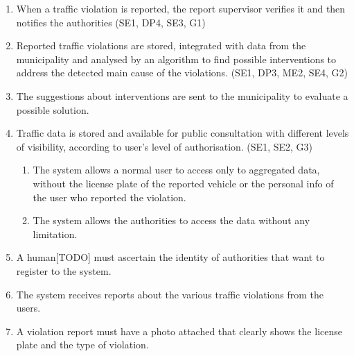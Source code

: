 \begin{enumerate}[label={R\arabic*.}]
    \item When a traffic violation is reported, the report supervisor verifies it and then notifies the authorities (SE1, DP4, SE3, G1)
    \item Reported traffic violations are stored, integrated with data from the municipality and analysed by an algorithm to find possible interventions to address the detected main cause of the violations. (SE1, DP3, ME2, SE4, G2)
    \item The suggestions about interventions are sent to the municipality to evaluate a possible solution.
    \item Traffic data is stored and available for public consultation with different levels of visibility, according to user's level of authorisation. (SE1, SE2, G3)
    \begin{enumerate}[label={R\arabic{enumi}.\arabic*.}]
    	\item The system allows a normal user to access only to aggregated data, without the license plate of the reported vehicle or the personal info of the user who reported the violation.
    	\item The system allows the authorities to access the data without any limitation.
    \end{enumerate}
	\item A human[TODO] must ascertain the identity of authorities that want to register to the system.
	\item The system receives reports about the various traffic violations from the users.
	\item A violation report must have a photo attached that clearly shows the license plate and the type of violation. 
\end{enumerate}